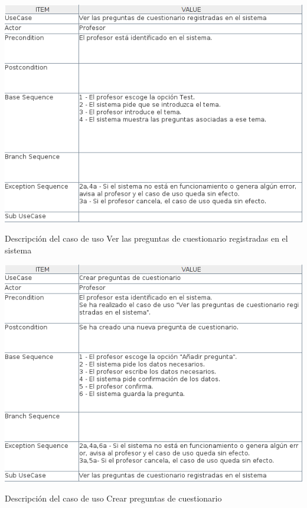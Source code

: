 \documentclass[openright,twoside,10pt]{book}
\begin{document}
    \vspace*{\fill}
    
    \newpage
    
    \vspace*{\fill}
    
    \begin{table}[H]
        \begin{center}
            \includegraphics[width=\textwidth]{img/astah/analisis/casos_de_uso/useCase12.png}
        \end{center}
        \caption{Descripción del caso de uso Ver las preguntas de cuestionario registradas en el sistema}
    \end{table}
    
    \vspace*{\fill}
    
    \newpage
    
    \vspace*{\fill}
    
    \begin{table}[H]
        \begin{center}
            \includegraphics[width=\textwidth]{img/astah/analisis/casos_de_uso/useCase13.png}
        \end{center}
        \caption{Descripción del caso de uso Crear preguntas de cuestionario}
    \end{table}
    
\end{document}
